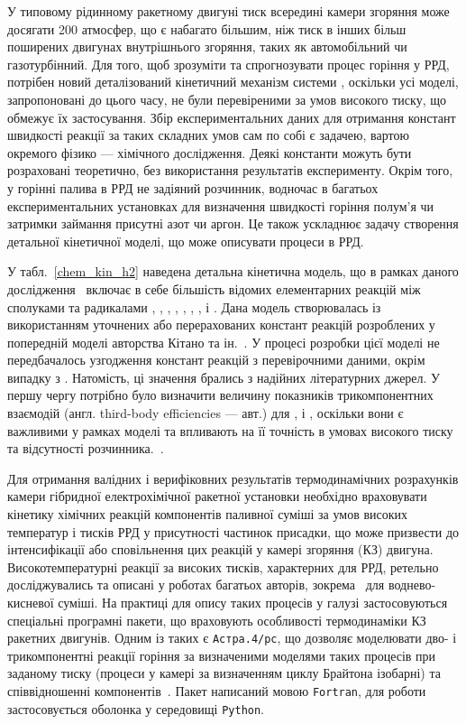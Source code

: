 У типовому рідинному ракетному двигуні тиск всередині камери згоряння може досягати 200 атмосфер, що є набагато більшим, ніж тиск в інших більш поширених двигунах внутрішнього згоряння, таких як автомобільний чи газотурбінний. Для того, щоб зрозуміти та спрогнозувати процес горіння у РРД, потрібен новий деталізований кінетичний механізм системи , оскільки усі моделі, запропоновані до цього часу, не були перевіреними за умов високого тиску, що обмежує їх застосування. Збір експериментальних даних для отримання констант швидкості реакції за таких складних умов сам по собі є задачею, вартою окремого фізико --- хімічного дослідження. Деякі константи можуть бути розраховані теоретично, без використання результатів експерименту. Окрім того, у горінні палива в РРД не задіяний розчинник, водночас в багатьох експериментальних установках для визначення швидкості горіння полум'я чи затримки займання присутні азот чи аргон. Це також ускладнює задачу створення детальної кінетичної моделі, що може описувати процеси в РРД.~\cite[с. 383 -- 384]{Shimizu}

У табл.~\ref{chem_kin_h2} наведена детальна кінетична модель, що в рамках даного дослідження~\cite{Shimizu} включає в себе більшість відомих елементарних реакцій між сполуками та радикалами , , , , , , , і . Дана модель створювалась із використанням уточнених або перерахованих констант реакцій розроблених у попередній моделі авторства Кітано та ін.~\cite[с. 2355 -- 2362]{Kitano}. У процесі розробки цієї моделі не передбачалось узгодження констант реакцій з перевірочними даними, окрім випадку з . Натомість, ці значення брались з надійних літературних джерел. У першу чергу потрібно було визначити величину показників трикомпонентних взаємодій (англ. third-body efficiencies --- авт.) для ,  і , оскільки вони є важливими у рамках моделі та впливають на її точність в умовах високого тиску та відсутності розчинника.~\cite[с. 384 -- 385]{Shimizu}.

Для отримання валідних і верифіковних результатів термодинамічних розрахунків камери гібридної електрохімічної ракетної установки необхідно враховувати кінетику хімічних реакцій компонентів паливної суміші за умов високих температур і тисків РРД у присутності частинок присадки, що може призвести до інтенсифікації або сповільнення цих реакцій у камері згоряння (КЗ) двигуна. Високотемпературні реакції за високих тисків, характерних для РРД, ретельно досліджувались та описані у роботах багатьох авторів, зокрема~\cite{Shimizu} для воднево-кисневої суміші. На практиці для опису таких процесів у галузі застосовуються спеціальні програмні пакети, що враховують особливості термодинаміки КЗ ракетних двигунів. Одним із таких є \texttt{Астра.4/рс}, що дозволяє моделювати дво- і трикомпонентні реакції горіння за визначеними моделями таких процесів при заданому тиску (процеси у камері за визначенням циклу Брайтона ізобарні) та співвідношенні компонентів~\cite{Astra}. Пакет написаний мовою \texttt{Fortran}, для роботи застосовується оболонка у середовищі \texttt{Python}. 


